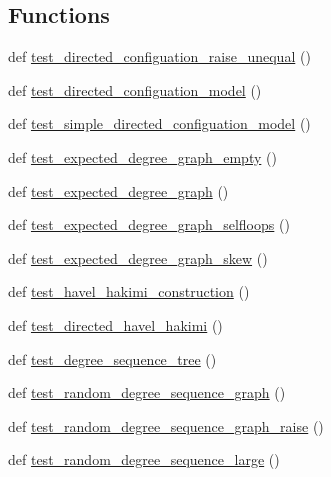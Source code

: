 \subsection*{Functions}
\begin{DoxyCompactItemize}
\item 
def \hyperlink{namespacenetworkx_1_1generators_1_1tests_1_1test__degree__seq_ae31718189456c0b3400d28915b079ed7}{test\+\_\+directed\+\_\+configuation\+\_\+raise\+\_\+unequal} ()
\item 
def \hyperlink{namespacenetworkx_1_1generators_1_1tests_1_1test__degree__seq_a1de8bdc4e0816f4101c1e77c4667b874}{test\+\_\+directed\+\_\+configuation\+\_\+model} ()
\item 
def \hyperlink{namespacenetworkx_1_1generators_1_1tests_1_1test__degree__seq_a42ef199815403fc106a401d5df249916}{test\+\_\+simple\+\_\+directed\+\_\+configuation\+\_\+model} ()
\item 
def \hyperlink{namespacenetworkx_1_1generators_1_1tests_1_1test__degree__seq_ab178b236957531c80b02dc2fed5ace2b}{test\+\_\+expected\+\_\+degree\+\_\+graph\+\_\+empty} ()
\item 
def \hyperlink{namespacenetworkx_1_1generators_1_1tests_1_1test__degree__seq_a29444ad1b53f0086d223aa18b63b2c77}{test\+\_\+expected\+\_\+degree\+\_\+graph} ()
\item 
def \hyperlink{namespacenetworkx_1_1generators_1_1tests_1_1test__degree__seq_ac1be29227c1d58b5cb60a86dfd597fdb}{test\+\_\+expected\+\_\+degree\+\_\+graph\+\_\+selfloops} ()
\item 
def \hyperlink{namespacenetworkx_1_1generators_1_1tests_1_1test__degree__seq_a166426a3ffa85f2cfc22e92ee698abdb}{test\+\_\+expected\+\_\+degree\+\_\+graph\+\_\+skew} ()
\item 
def \hyperlink{namespacenetworkx_1_1generators_1_1tests_1_1test__degree__seq_ac597867fd64fe1ae0798e841ade1e1bb}{test\+\_\+havel\+\_\+hakimi\+\_\+construction} ()
\item 
def \hyperlink{namespacenetworkx_1_1generators_1_1tests_1_1test__degree__seq_a780bef581de39dceb03b73430cad9d63}{test\+\_\+directed\+\_\+havel\+\_\+hakimi} ()
\item 
def \hyperlink{namespacenetworkx_1_1generators_1_1tests_1_1test__degree__seq_a7311b62c4e9f53d9943d0a82199c5ab4}{test\+\_\+degree\+\_\+sequence\+\_\+tree} ()
\item 
def \hyperlink{namespacenetworkx_1_1generators_1_1tests_1_1test__degree__seq_a0765be29ede742f84564f811d83a55c6}{test\+\_\+random\+\_\+degree\+\_\+sequence\+\_\+graph} ()
\item 
def \hyperlink{namespacenetworkx_1_1generators_1_1tests_1_1test__degree__seq_a9b93dc32c0e71ef217762cf968cfa409}{test\+\_\+random\+\_\+degree\+\_\+sequence\+\_\+graph\+\_\+raise} ()
\item 
def \hyperlink{namespacenetworkx_1_1generators_1_1tests_1_1test__degree__seq_ae36c956d815eb7195774d6219ed9f3ea}{test\+\_\+random\+\_\+degree\+\_\+sequence\+\_\+large} ()
\end{DoxyCompactItemize}


